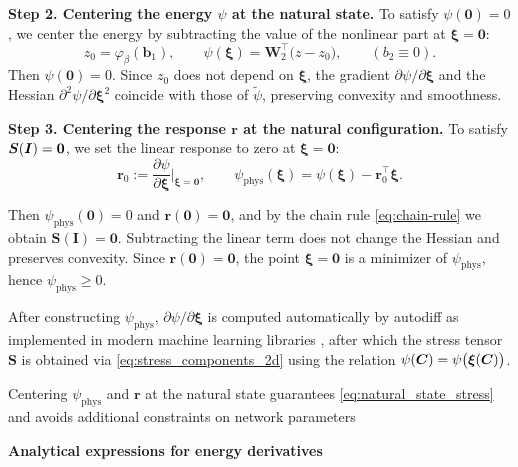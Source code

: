 \textbf{Step 2. Centering the energy $\psi$ at the natural state.}
To satisfy $\psi(\mathbf{0})=0$, we center the energy by
subtracting the value of the nonlinear part at $\boldsymbol{\xi}=\mathbf{0}$:
\begin{equation}
  z_0 = \varphi_{\beta}(\mathbf{b}_1),\qquad
  \psi(\boldsymbol{\xi}) = \mathbf{W}_2^{\top}\big(z - z_0\big),\qquad (b_2 \equiv 0).
  \label{eq:center_psi}
\end{equation}
Then $\psi(\mathbf{0})=0$. Since $z_0$ does not depend on $\boldsymbol{\xi}$, 
the gradient $\partial\psi/\partial\boldsymbol{\xi}$ and the Hessian $\partial^2\psi/\partial\boldsymbol{\xi}^2$ 
coincide with those of $\tilde{\psi}$, preserving convexity and smoothness.

\textbf{Step 3. Centering the response $\mathbf{r}$ at the natural configuration.}
To satisfy $\boldsymbol{S}(\boldsymbol{I})=\boldsymbol{0}$, we set the linear response to zero at 
$\boldsymbol{\xi}=\mathbf{0}$:
\begin{equation}
  \mathbf{r}_0 := \frac{\partial \psi}{\partial \boldsymbol{\xi}}\bigg|_{\boldsymbol{\xi}=\mathbf{0}},\qquad
  \psi_{\mathrm{phys}}(\boldsymbol{\xi}) = \psi(\boldsymbol{\xi}) - \mathbf{r}_0^{\top}\boldsymbol{\xi}.
  \label{eq:phys_energy}
\end{equation}

Then $\psi_{\mathrm{phys}}(\mathbf{0})=0$ and $\mathbf{r}(\mathbf{0})=\mathbf{0}$, 
and by the chain rule \eqref{eq:chain-rule} we obtain $\mathbf{S}(\mathbf{I})=\mathbf{0}$. 
Subtracting the linear term does not change the Hessian and preserves convexity. 
Since $\mathbf{r}(\mathbf{0})=\mathbf{0}$, the point $\boldsymbol{\xi}=\mathbf{0}$ is a minimizer of 
$\psi_{\mathrm{phys}}$, hence $\psi_{\mathrm{phys}}\ge 0$.

After constructing $\psi_{\mathrm{phys}}$, 
$\partial\psi/\partial\boldsymbol{\xi}$ is computed automatically by autodiff as implemented in modern machine learning libraries 
\cite{pytorch2019,tensorflow2016,jax2018}, 
after which the stress tensor $\mathbf{S}$ is obtained via \eqref{eq:stress_components_2d} using the relation $\psi(\boldsymbol{C})=\psi\big(\boldsymbol{\xi}(\boldsymbol{C})\big)$.

Centering $\psi_{\mathrm{phys}}$ and $\mathbf{r}$ at the natural state 
guarantees \eqref{eq:natural_state_stress} and avoids additional constraints on network parameters


\textbf{Analytical expressions for energy derivatives}

